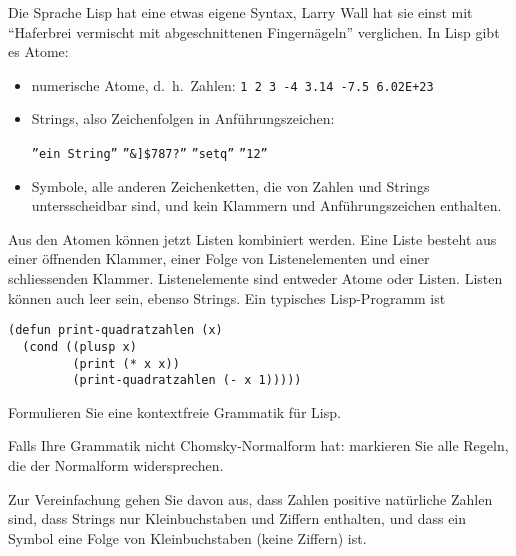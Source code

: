 Die Sprache Lisp hat eine etwas eigene Syntax, Larry Wall hat sie einst
mit ``Haferbrei vermischt mit abgeschnittenen Fingernägeln'' verglichen.
In Lisp gibt es Atome:
\begin{itemize}
\item numerische Atome, d.~h.~Zahlen: {\tt 1 2 3
-4  3.14  -7.5  6.02E+23}
\item Strings, also Zeichenfolgen in Anführungszeichen:
\begin{center}
{\tt \textquotedblright ein String\textquotedblright}
{\tt \textquotedblright \&]\$787?\textquotedblright}
{\tt \textquotedblright setq\textquotedblright}
{\tt \textquotedblright 12\textquotedblright}
\end{center}
\item Symbole, alle anderen Zeichenketten, die von Zahlen und Strings
untersscheidbar sind, und kein Klammern und Anführungszeichen enthalten.
\end{itemize}
Aus den Atomen können jetzt Listen kombiniert werden. Eine Liste besteht
aus einer öffnenden Klammer, einer Folge von Listenelementen und
einer schliessenden Klammer. Listenelemente sind entweder Atome oder Listen.
Listen können auch leer sein, ebenso Strings.
Ein typisches Lisp-Programm ist
\begin{verbatim}
(defun print-quadratzahlen (x)
  (cond ((plusp x)
         (print (* x x))
         (print-quadratzahlen (- x 1)))))
\end{verbatim}
\begin{teilaufgaben}
\item
Formulieren Sie eine kontextfreie Grammatik für Lisp.
\item
Falls Ihre Grammatik nicht Chomsky-Normalform hat: markieren Sie
alle Regeln, die der Normalform widersprechen.
\end{teilaufgaben}

\begin{hinweis}
Zur Vereinfachung gehen Sie davon aus, dass Zahlen positive natürliche
Zahlen sind, dass Strings nur Kleinbuchstaben und Ziffern enthalten, und
dass ein Symbol eine Folge von Kleinbuchstaben (keine Ziffern) ist.
\end{hinweis}


